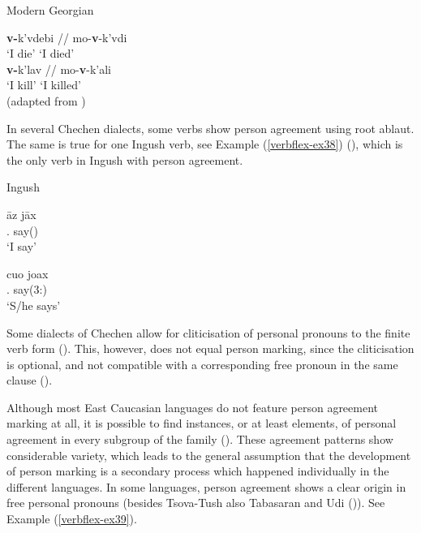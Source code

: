 \begin{exe}
	\ex\label{verbflex-ex37}
	Modern Georgian
	\begin{xlist}
		
		
			\ex\label{verbflex-ex37a}
			\gll \textbf{v-}k'vdebi {} {//} {} mo-\textbf{v}-k'vdi \\ 
			{`I die'} {} {} {} {`I died'}\\
		
		
		
			\ex\label{verbflex-ex37b}
			\gll \textbf{v-}k'lav {} {//} {} mo-\textbf{v}-k'ali \\ 
			{`I kill'} {} {} {} {`I killed'} \\
			\hfill (adapted from \cite[291]{kojima19})
		
		
	\end{xlist}
\end{exe}

In several Chechen dialects, some verbs show person agreement using root ablaut. The same is true for one Ingush verb, see Example (\ref{verbflex-ex38}) (\cites[439]{nichols11}[103]{nichols94Ing}), which is the only verb in Ingush with person agreement. 

\begin{exe}
	\ex\label{verbflex-ex38}
	Ingush
	\begin{xlist}
		
		
			\ex\label{verbflex-ex38a}
			\gll \={a}z j\={a}x \\
			{\Fsg}.{\Erg} say({\Prs}) \\
			\trans `I say'
		
		
		
			\ex\label{verbflex-ex38b}
			\gll cuo joax \\
			{\Tsg}.{\Erg} say(3:{\Prs})    \\
			\trans `S/he says'
		
		
	\end{xlist}
\end{exe}

Some dialects of Chechen allow for cliticisation of personal pronouns to the finite verb form (\cites[210--213]{imnaishvili68}). This, however, does not equal person marking, since the cliticisation is optional, and not compatible with a corresponding free pronoun in the same clause (\cites[279]{kojima19}).

Although most East Caucasian languages do not feature person agreement marking at all, it is possible to find instances, or at least elements, of personal agreement in every subgroup of the family (\cite[131]{helmbrecht96}). These agreement patterns show considerable variety, which leads to the general assumption that the development of person marking is a secondary process which happened individually in the different languages. In some languages, person agreement shows a clear origin in free personal pronouns (besides Tsova-Tush also Tabasaran and Udi (\cites[143]{helmbrecht96})). See Example (\ref{verbflex-ex39}).

